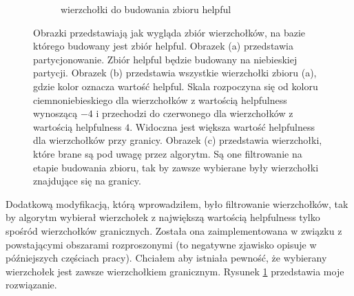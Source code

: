 \begin{figure}[h]
\begin{subfigure}{.32\textwidth}
    \caption[short]{wierzchołki do budowania zbioru helpful}
\end{subfigure}
\caption{Obrazki przedstawiają jak wygląda zbiór wierzchołków, na bazie którego budowany jest zbiór helpful.
Obrazek (a) przedstawia partycjonowanie. Zbiór helpful będzie budowany na niebieskiej partycji.
Obrazek (b) przedstawia wszystkie wierzchołki zbioru (a), gdzie kolor oznacza wartość helpful. Skala rozpoczyna się od
koloru ciemnoniebieskiego dla wierzchołków z wartością helpfulness wynoszącą $-4$ i przechodzi do czerwonego dla wierzchołków z
wartością helpfulness $4$. Widoczna jest większa wartość helpfulness dla wierzchołków przy granicy. Obrazek (c)
przedstawia wierzchołki, które brane są pod uwagę przez algorytm. Są one filtrowanie na etapie budowania zbioru,
tak by zawsze wybierane były wierzchołki znajdujące się na granicy.}
\label{im:building_helpfulsets}
\end{figure}

Dodatkową modyfikacją, którą wprowadziłem, było filtrowanie wierzchołków, tak by algorytm wybierał wierzchołek z największą
wartością helpfulness tylko spośród wierzchołków granicznych.
Została ona zaimplementowana w związku z powstającymi obszarami rozproszonymi
(to negatywne zjawisko opisuje w późniejszych częściach pracy).
Chciałem aby istniała pewność, że wybierany wierzchołek jest zawsze wierzchołkiem granicznym.
Rysunek \ref{im:building_helpfulsets} przedstawia moje rozwiązanie.